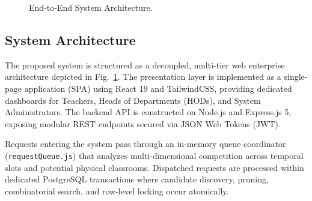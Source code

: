 \documentclass[conference]{IEEEtran}
\begin{document}
\begin{figure}[t]
\centering
{}
\caption{End-to-End System Architecture.}
\label{fig:arch}
\end{figure}

\subsection{System Architecture}
The proposed system is structured as a decoupled, multi-tier web enterprise architecture depicted in Fig.~\ref{fig:arch}. The presentation layer is implemented as a single-page application (SPA) using React 19 and TailwindCSS, providing dedicated dashboards for Teachers, Heads of Departments (HODs), and System Administrators. The backend API is constructed on Node.js and Express.js 5, exposing modular REST endpoints secured via JSON Web Tokens (JWT). 

Requests entering the system pass through an in-memory queue coordinator (\texttt{requestQueue.js}) that analyzes multi-dimensional competition across temporal slots and potential physical classrooms. Dispatched requests are processed within dedicated PostgreSQL transactions where candidate discovery, pruning, combinatorial search, and row-level locking occur atomically.
\end{document}
